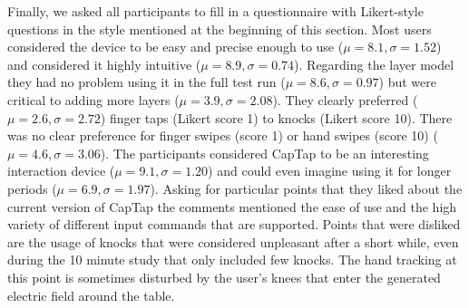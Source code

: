 Finally, we asked all participants to fill in a questionnaire with Likert-style questions in the style mentioned at the beginning of this section. Most users considered the device to be easy and precise enough to use ($\mu=8.1, \sigma=1.52$) and considered it highly intuitive ($\mu=8.9, \sigma=0.74$). Regarding the layer model they had no problem using it in the full test run ($\mu=8.6, \sigma=0.97$) but were critical to adding more layers ($\mu=3.9, \sigma=2.08$). They clearly preferred ($\mu=2.6, \sigma=2.72$) finger taps (Likert score 1) to knocks (Likert score 10). There was no clear preference for finger swipes (score 1) or hand swipes (score 10) ($\mu=4.6, \sigma=3.06$). The participants considered CapTap to be an interesting interaction device ($\mu=9.1, \sigma=1.20$) and could even imagine using it for longer periods ($\mu=6.9, \sigma=1.97$). Asking for particular points that they liked about the current version of CapTap the comments mentioned the ease of use and the high variety of different input commands that are supported. Points that were disliked are the usage of knocks that were considered unpleasant after a short while, even during the 10 minute study that only included few knocks. The hand tracking at this point is sometimes disturbed by the user's knees that enter the generated electric field around the table.


